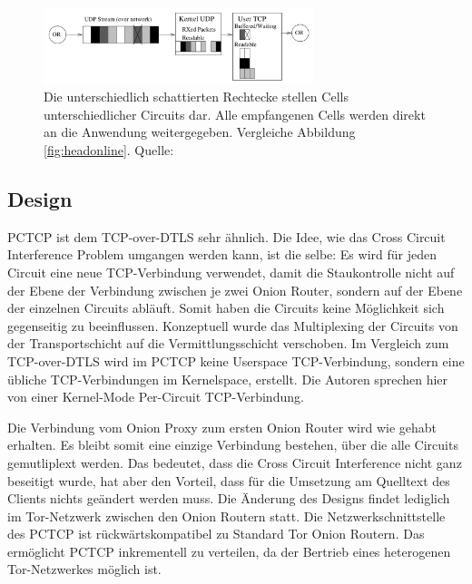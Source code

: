 \documentclass[fleqn,envcountsame,runningheads,10pt,a4paper]{llncs}
\begin{document}
\begin{figure}[h]
  \begin{center}
    \includegraphics[width=0.7\textwidth]{pics/headonlinedtls.pdf}
    \caption{Die unterschiedlich schattierten Rechtecke stellen Cells unterschiedlicher Circuits dar. Alle empfangenen Cells werden direkt an die Anwendung weitergegeben. Vergleiche Abbildung \ref{fig:headonline}. Quelle:\cite{tcp-over-dtls}}
    \label{fig:headonlinedtls} 
  \end{center} 
\end{figure} 

\subsection{Design}

PCTCP ist dem TCP-over-DTLS sehr ähnlich. Die Idee, wie das Cross Circuit 
Interference Problem umgangen werden kann, ist die selbe: Es wird für jeden 
Circuit eine neue TCP-Verbindung verwendet, damit die Staukontrolle nicht auf 
der Ebene der Verbindung zwischen je zwei Onion Router, sondern auf der Ebene 
der einzelnen Circuits abläuft. Somit haben die Circuits keine Möglichkeit sich 
gegenseitig zu beeinflussen. Konzeptuell wurde das Multiplexing der Circuits von 
der Transportschicht auf die Vermittlungsschicht verschoben. Im Vergleich zum 
TCP-over-DTLS wird im PCTCP keine Userspace TCP-Verbindung, sondern eine übliche 
TCP-Verbindungen im Kernelspace, erstellt. Die Autoren sprechen hier von einer 
Kernel-Mode Per-Circuit TCP-Verbindung. 

Die Verbindung vom Onion Proxy zum ersten Onion Router wird wie gehabt erhalten. 
Es bleibt somit eine einzige Verbindung bestehen, über die alle Circuits 
gemutliplext werden. Das bedeutet, dass die Cross Circuit Interference nicht 
ganz beseitigt wurde, hat aber den Vorteil, dass für die Umsetzung am Quelltext 
des Clients nichts geändert werden muss. Die Änderung des Designs findet 
lediglich im Tor-Netzwerk zwischen den Onion Routern statt. Die 
Netzwerkschnittstelle des PCTCP ist rückwärtskompatibel zu Standard Tor Onion 
Routern. Das ermöglicht PCTCP inkrementell zu verteilen, da der Bertrieb eines 
heterogenen Tor-Netzwerkes möglich ist.
\end{document}
